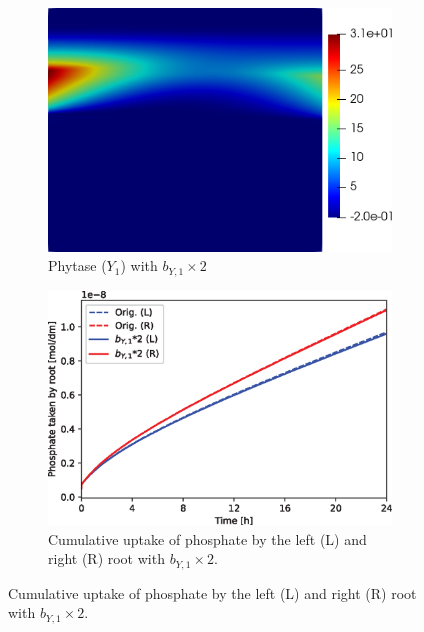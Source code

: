 \documentclass[11pt]{article}
\numberwithin{equation}{section}
\begin{document}
\begin{figure}[!htb]
\centering
\begin{subfigure}[t]{0.35\textwidth}
    \includegraphics[width=\textwidth]{Figures/Y1_bY1times2.png}
    \caption{Phytase ($Y_1$) with $b_{Y,1} \times 2$ }
    \label{fig:numexp_by1up1}
\end{subfigure}
\hspace{1cm}
\begin{subfigure}[t]{0.4\textwidth}
    \includegraphics[width=\textwidth]{Figures/bY1times2.eps}
    \caption{Cumulative uptake of phosphate by the left (L) and right (R) root with $b_{Y,1} \times 2$.}
    \label{fig:numexp_by1up2}
\end{subfigure}
\qquad


\end{figure}
\end{document}
